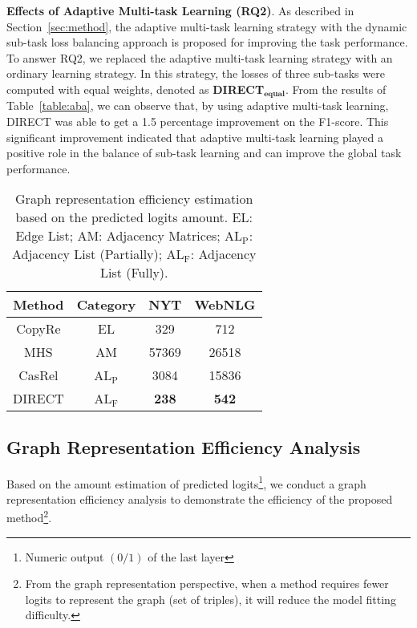 \documentclass[11pt,a4paper]{article}
\begin{document}
\textbf{Effects of Adaptive Multi-task Learning (RQ2)}. As described in Section~\ref{sec:method}, the adaptive multi-task learning strategy with the dynamic sub-task loss balancing approach is proposed for improving the task performance. To answer RQ2, we replaced the adaptive multi-task learning strategy with an ordinary learning strategy. In this strategy, the losses of three sub-tasks were computed with equal weights, denoted as \textbf{DIRECT$_\mathbf{equal}$}. From the results of Table~\ref{table:aba}, we can observe that, by using adaptive multi-task learning, DIRECT was able to get a 1.5 percentage improvement on the F1-score. This significant improvement indicated that adaptive multi-task learning played a positive role in the balance of sub-task learning and can improve the global task performance.











\begin{table}[htbp]
\centering
\begin{tabular}{c|c|cc}
\toprule[1pt]
Method & Category  & NYT & WebNLG\\
\hline
CopyRe & EL &  329 & 712 \\
MHS & AM  & 57369 & 26518 \\
CasRel & AL$_\text{P}$ & 3084 & 15836 \\
\hline
DIRECT& AL$_\text{F}$ &  \textbf{238} & \textbf{542} \\
\bottomrule[1pt]
\end{tabular}
\caption{Graph representation efficiency estimation based on the predicted logits amount. EL: Edge List; AM: Adjacency Matrices; AL$_\text{P}$: Adjacency List (Partially); AL$_\text{F}$: Adjacency List (Fully).}
\label{tab:logit1}
\end{table}

\subsection{Graph Representation Efficiency Analysis}\label{sec:computation}
Based on the amount estimation of predicted logits\footnote{Numeric output $(0/1)$ of the last layer}, we conduct a graph representation efficiency analysis to demonstrate the efficiency of the proposed method\footnote{From the graph representation perspective, when a method requires fewer logits to represent the graph (set of triples), it will reduce the model fitting difficulty.}.
\end{document}
